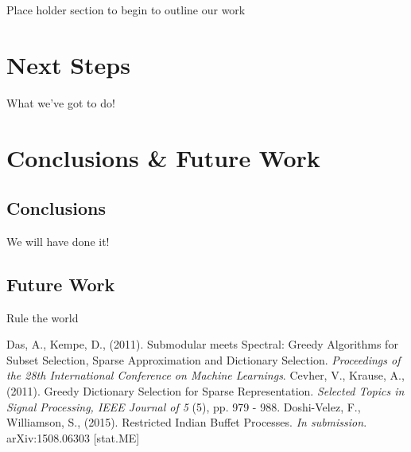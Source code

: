 \documentclass{article}
\begin{document}
Place holder section to begin to outline our work

\section{Next Steps} \label{next steps}

What we've got to do!


\section{Conclusions \& Future Work}
\subsection{Conclusions}
We will have done it!
 
\subsection{Future Work}
Rule the world 

\begin{thebibliography}{99}
  Das, A., Kempe, D., (2011). Submodular meets Spectral: Greedy Algorithms for Subset Selection, Sparse Approximation and Dictionary Selection. \textit{Proceedings of the 28th International Conference on Machine Learnings}.
  Cevher, V., Krause, A., (2011). Greedy Dictionary Selection for Sparse Representation. \textit{Selected Topics in Signal Processing, IEEE Journal of 5} (5), pp. 979 - 988.
  Doshi-Velez, F., Williamson, S., (2015). Restricted Indian Buffet Processes. \textit{In submission}. arXiv:1508.06303 [stat.ME]
  
\end{thebibliography}
\end{document}

